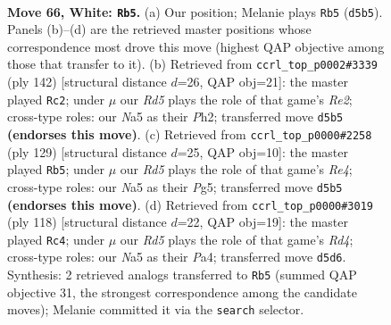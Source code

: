 \documentclass[11pt]{article}
\begin{document}
\clearpage

\begin{figure}[p]\centering
\begin{subfigure}{0.46\textwidth}\centering
\resizebox{\linewidth}{!}{%
\newchessgame
\chessboard[
  setfen={8/6p1/5pk1/N2R3p/3P3P/6PK/r7/8 w - - 25 66},
  showmover=false,
  pgfstyle=straightmove, color=movearrow, markmove={d5-b5}
]}
\caption{}
\end{subfigure}\hfill
\begin{subfigure}{0.46\textwidth}\centering
\resizebox{\linewidth}{!}{%
\newchessgame
\chessboard[
  setfen={8/8/5k2/4p1p1/6P1/4KP1p/4R2P/7r w - - 13 72},
  showmover=false,
  pgfstyle=straightmove, color=movearrow, markmove={e2-c2}
]}
\caption{}
\end{subfigure}
\\[4pt]
\begin{subfigure}{0.46\textwidth}\centering
\resizebox{\linewidth}{!}{%
\newchessgame
\chessboard[
  setfen={8/8/4pk2/4r1p1/5pP1/5P2/R3P1K1/8 b - - 31 65},
  showmover=false,
  pgfstyle=straightmove, color=movearrow, markmove={e5-b5}
]}
\caption{}
\end{subfigure}\hfill
\begin{subfigure}{0.46\textwidth}\centering
\resizebox{\linewidth}{!}{%
\newchessgame
\chessboard[
  setfen={8/8/6pk/p5p1/P2R1p2/5P1P/5KP1/r7 w - - 16 60},
  showmover=false,
  pgfstyle=straightmove, color=movearrow, markmove={d4-c4}
]}
\caption{}
\end{subfigure}
\caption{\textbf{Move 66, White: \texttt{Rb5}.} (a) Our position; Melanie plays \texttt{Rb5} (\texttt{d5b5}). Panels (b)--(d) are the retrieved master positions whose correspondence most drove this move (highest QAP objective among those that transfer to it). (b) Retrieved from \texttt{ccrl\_top\_p0002\#3339} (ply 142) [structural distance $d$=26, QAP obj=21]: the master played \texttt{Rc2}; under $\mu$ our \emph{Rd5} plays the role of that game's \emph{Re2}; cross-type roles: our \emph{N}a5 as their \emph{P}h2; transferred move \texttt{d5b5} \textbf{(endorses this move)}. (c) Retrieved from \texttt{ccrl\_top\_p0000\#2258} (ply 129) [structural distance $d$=25, QAP obj=10]: the master played \texttt{Rb5}; under $\mu$ our \emph{Rd5} plays the role of that game's \emph{Re4}; cross-type roles: our \emph{N}a5 as their \emph{P}g5; transferred move \texttt{d5b5} \textbf{(endorses this move)}. (d) Retrieved from \texttt{ccrl\_top\_p0000\#3019} (ply 118) [structural distance $d$=22, QAP obj=19]: the master played \texttt{Rc4}; under $\mu$ our \emph{Rd5} plays the role of that game's \emph{Rd4}; cross-type roles: our \emph{N}a5 as their \emph{P}a4; transferred move \texttt{d5d6}. Synthesis: 2 retrieved analogs transferred to \texttt{Rb5} (summed QAP objective 31, the strongest correspondence among the candidate moves); Melanie committed it via the \texttt{search} selector.}
\label{fig:thought-m130}
\end{figure}
\end{document}
